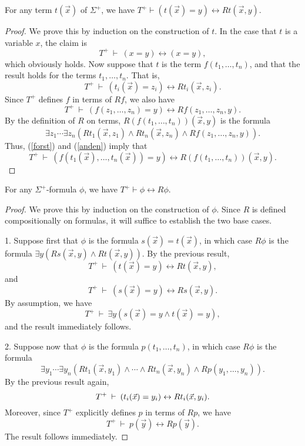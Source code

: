 
\begin{lemma} For any term $t(\vec{x})$ of $\Sigma ^+$, we have
  $T^+\vdash (t(\vec{x})=y) \leftrightarrow
  Rt(\vec{x},y)$.  \end{lemma}

\begin{proof} We prove this by induction on the construction of $t$.
  In the case that $t$ is a variable $x$, the claim is
  \[ T^+\:\vdash\: (x=y)\leftrightarrow (x=y) ,\] which obviously
  holds.  Now suppose that $t$ is the term $f(t_1,\dots ,t_n)$, and
  that the result holds for the terms $t_1,\dots ,t_n$.  That is,
  \begin{equation} T^+\:\vdash\: (t_i(\vec{x})=z_i)\leftrightarrow
    Rt_i(\vec{x},z_i) .\label{forst} \end{equation} Since $T^+$
  defines $f$ in terms of $Rf$, we also have
  \begin{equation} T^+\:\vdash \: (f(z_1,\dots ,z_n)=y)\leftrightarrow
    Rf(z_1,\dots ,z_n,y) .\label{anden} \end{equation} By the
  definition of $R$ on terms, $R(f(t_1,\dots ,t_n))(\vec{x},y)$ is the
  formula
  \[ \exists z_1\cdots \exists z_n(Rt_1(\vec{x},z_1)\wedge
    Rt_n(\vec{x},z_n)\wedge Rf(z_1,\dots ,z_n,y)) .\] Thus,
  (\ref{forst}) and (\ref{anden}) imply that
  \[ T^+ \: \vdash \: (f(t_1(\vec{x}),\dots
    ,t_n(\vec{x}))=y)\leftrightarrow R(f(t_1,\dots ,t_n))(\vec{x},y)
    .\]
  \end{proof}


  \begin{lemma} For any $\Sigma ^+$-formula $\phi$, we have
    $T^+\vdash \phi\leftrightarrow
    R\phi$. \label{upstairs} \end{lemma}

\begin{proof} We prove this by induction on the construction of
  $\phi$.  Since $R$ is defined compositionally on formulas, it will
  suffice to establish the two base cases.

  1. Suppose first that $\phi$ is the formula $s(\vec{x})=t(\vec{x})$,
  in which case $R\phi$ is the formula
  $\exists y(Rs(\vec{x},y)\wedge Rt(\vec{x},y))$.  By the previous
  result,
  \[ T^+\: \vdash \: (t(\vec{x})=y)\leftrightarrow Rt(\vec{x},y) ,\]
  and
  \[ T^+\: \vdash \: (s(\vec{x})=y)\leftrightarrow Rs(\vec{x},y) .\]
  By assumption, we have
  \[ T^+\: \vdash \: \exists y (s(\vec{x})=y\wedge t(\vec{x})=y ) ,\]
  and the result immediately follows.

  2. Suppose now that $\phi$ is the formula $p(t_1,\dots ,t_n)$, in
  which case $R\phi$ is the formula
  \[ \exists y_1\cdots \exists y_n(Rt_1(\vec{x},y_1)\wedge \cdots
    \wedge Rt_n(\vec{x},y_n)\wedge Rp(y_1,\dots ,y_n)) .\] By the
  previous result again,
  \[ T^+\:\vdash\: (t_i(\vec{x})=y_i)\leftrightarrow Rt_i(\vec{x},y_i) .\]
  Moreover, since $T^+$ explicitly defines $p$ in terms of $Rp$, we
  have
  \[ T^+\: \vdash \: p(\vec{y})\leftrightarrow Rp(\vec{y}) .\] The
  result follows immediately.
\end{proof}



